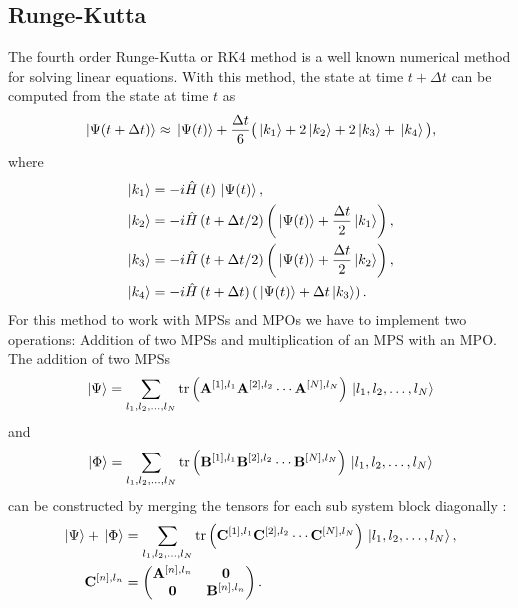\subsection{Runge-Kutta}
The fourth order Runge-Kutta or RK4 method is a well known numerical method for solving linear equations.
With this method, the state at time $t + \Delta t$ can be computed from the state at time $t$ as
\begin{equation*}
    \ket*{\Psi(t+\Delta t)} \approx \ket*{\Psi(t)} + \frac{\Delta t}{6}\big(
        \ket*{k_1} + 2\ket*{k_2} + 2\ket*{k_3} + \ket*{k_4}
    \big),
\end{equation*}
where
\begin{equation*}
    \begin{split}
        \ket*{k_1} &= -i\hat{H}\left(t\right)\ket*{\Psi(t)}, \\
        \ket*{k_2} &= -i\hat{H}\left(t + \Delta t/2\right)\left(\ket*{\Psi(t)} + \frac{\Delta t}{2}\ket*{k_1}\right), \\
        \ket*{k_3} &= -i\hat{H}\left(t + \Delta t/2\right)\left(\ket*{\Psi(t)} + \frac{\Delta t}{2}\ket*{k_2}\right), \\
        \ket*{k_4} &= -i\hat{H}\left(t + \Delta t\right)\left(\ket*{\Psi(t)} + \Delta t\ket*{k_3}\right).
    \end{split}
\end{equation*}
For this method to work with MPSs and MPOs we have to implement two operations: Addition of two MPSs and multiplication of an MPS with an MPO.
The addition of two MPSs
\begin{equation*}
    \ket*{\Psi} = \sum_{l_1, l_2, \dots, l_N} \trace\left(
        \vectorbold{A}^{[1],l_1} \vectorbold{A}^{[2],l_2} \cdots \vectorbold{A}^{[N],l_N}
    \right) \ket*{l_1, l_2, \dots, l_N}
\end{equation*}
and
\begin{equation*}
    \ket*{\Phi} = \sum_{l_1, l_2, \dots, l_N} \trace\left(
        \vectorbold{B}^{[1],l_1} \vectorbold{B}^{[2],l_2} \cdots \vectorbold{B}^{[N],l_N}
    \right) \ket*{l_1, l_2, \dots, l_N}
\end{equation*}
can be constructed by merging the tensors for each sub system block diagonally \cite{Weitang:2020}:
\begin{equation*}
    \begin{split}
        \ket*{\Psi} + \ket*{\Phi} &= \sum_{l_1, l_2, \dots, l_N} \trace\left(
        \vectorbold{C}^{[1],l_1} \vectorbold{C}^{[2],l_2} \cdots \vectorbold{C}^{[N],l_N}
    \right) \ket*{l_1, l_2, \dots, l_N}, \\
    \vectorbold{C}^{[n], l_n} &= \begin{pmatrix}
        \vectorbold{A}^{[n], l_n} & \vectorbold{0}              \\
        \vectorbold{0}            & \vectorbold{B}^{[n], l_n}
    \end{pmatrix}.
    \end{split}
\end{equation*}
